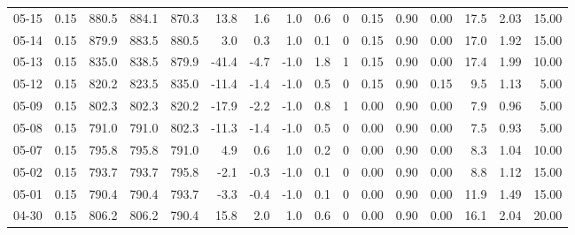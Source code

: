 \begin{threeparttable}
{\begin{tabular}{lrrrrrrrrrrrrrrr}
  05-15 &     0.15 & 880.5 & 884.1 & 870.3 &       13.8 &            1.6 &                      1.0 &                 0.6 &              0 &       0.15 &      0.90 &           0.00 &             17.5 &            2.03 &                  15.00 \\
  05-14 &     0.15 & 879.9 & 883.5 & 880.5 &        3.0 &            0.3 &                      1.0 &                 0.1 &              0 &       0.15 &      0.90 &           0.00 &             17.0 &            1.92 &                  15.00 \\
  05-13 &     0.15 & 835.0 & 838.5 & 879.9 &      -41.4 &           -4.7 &                     -1.0 &                 1.8 &              1 &       0.15 &      0.90 &           0.00 &             17.4 &            1.99 &                  10.00 \\
  05-12 &     0.15 & 820.2 & 823.5 & 835.0 &      -11.4 &           -1.4 &                     -1.0 &                 0.5 &              0 &       0.15 &      0.90 &           0.15 &              9.5 &            1.13 &                   5.00 \\
  05-09 &     0.15 & 802.3 & 802.3 & 820.2 &      -17.9 &           -2.2 &                     -1.0 &                 0.8 &              1 &       0.00 &      0.90 &           0.00 &              7.9 &            0.96 &                   5.00 \\
  05-08 &     0.15 & 791.0 & 791.0 & 802.3 &      -11.3 &           -1.4 &                     -1.0 &                 0.5 &              0 &       0.00 &      0.90 &           0.00 &              7.5 &            0.93 &                   5.00 \\
  05-07 &     0.15 & 795.8 & 795.8 & 791.0 &        4.9 &            0.6 &                      1.0 &                 0.2 &              0 &       0.00 &      0.90 &           0.00 &              8.3 &            1.04 &                  10.00 \\
  05-02 &     0.15 & 793.7 & 793.7 & 795.8 &       -2.1 &           -0.3 &                     -1.0 &                 0.1 &              0 &       0.00 &      0.90 &           0.00 &              8.8 &            1.12 &                  15.00 \\
  05-01 &     0.15 & 790.4 & 790.4 & 793.7 &       -3.3 &           -0.4 &                     -1.0 &                 0.1 &              0 &       0.00 &      0.90 &           0.00 &             11.9 &            1.49 &                  15.00 \\
  04-30 &     0.15 & 806.2 & 806.2 & 790.4 &       15.8 &            2.0 &                      1.0 &                 0.6 &              0 &       0.00 &      0.90 &           0.00 &             16.1 &            2.04 &                  20.00 \\

\end{tabular}}
\end{threeparttable}
